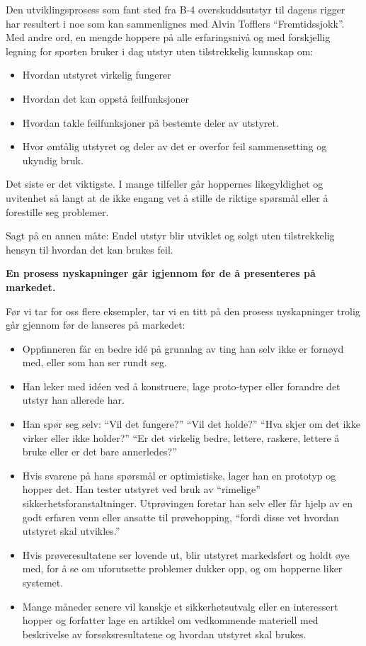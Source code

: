 Den utviklingsprosess som fant sted fra B-4 overskuddsutstyr til dagens rigger har resultert i noe som kan sammenlignes med Alvin Tofflers ``Fremtidssjokk''. Med andre ord, en mengde hoppere på alle erfaringsnivå og med forskjellig legning for sporten bruker i dag utstyr uten tilstrekkelig kunnskap om:
\begin{itemize}
	\item Hvordan utstyret virkelig fungerer
	\item Hvordan det kan oppstå feilfunksjoner
	\item Hvordan takle feilfunksjoner på bestemte deler av utstyret.
	\item Hvor ømtålig utstyret og deler av det er overfor feil sammensetting og ukyndig bruk.
\end{itemize}

Det siste er det viktigste. I mange tilfeller går hoppernes likegyldighet og uvitenhet så langt at de ikke engang vet å stille de riktige spørsmål eller å forestille seg problemer.

Sagt på en annen måte: Endel utstyr blir utviklet og solgt uten tilstrekkelig hensyn til hvordan det kan brukes feil.

\textbf{En prosess nyskapninger går igjennom før de å presenteres på markedet.}

Før vi tar for oss flere eksempler, tar vi en titt på den prosess nyskapninger trolig går gjennom før de lanseres på markedet:
\begin{itemize}
	\item Oppfinneren får en bedre idé på grunnlag av ting han selv ikke er fornøyd med, eller som han ser rundt seg.
	\item Han leker med idéen ved å konstruere, lage proto-typer eller forandre det utstyr han allerede har.
	\item Han spør seg selv: ``Vil det fungere?'' ``Vil det holde?'' ``Hva skjer om det ikke virker eller ikke holder?'' ``Er det virkelig bedre, lettere, raskere, lettere å bruke eller er det bare annerledes?''
	\item Hvis svarene på hans spørsmål er optimistiske, lager han en prototyp og hopper det. Han tester utstyret ved bruk av ``rimelige'' sikkerhetsforanstaltninger. Utprøvingen foretar han selv eller får hjelp av en godt erfaren venn eller ansatte til prøvehopping, ``fordi disse vet hvordan utstyret skal utvikles.''
	\item Hvis prøveresultatene ser lovende ut, blir utstyret markedsført og holdt øye med, for å se om uforutsette problemer dukker opp, og om hopperne liker systemet.
	\item Mange måneder senere vil kanskje et sikkerhetsutvalg eller en interessert hopper og forfatter lage en artikkel om vedkommende materiell med beskrivelse av forsøksresultatene og hvordan utstyret skal brukes.
\end{itemize}

